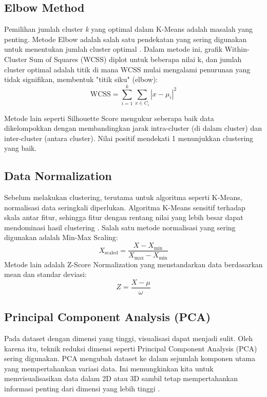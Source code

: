 \subsection{Elbow Method}
Pemilihan jumlah cluster \textit{k} yang optimal dalam K-Means adalah masalah yang penting. Metode Elbow adalah salah satu pendekatan yang sering digunakan untuk menentukan jumlah cluster optimal \cite{ElbowMethod}. Dalam metode ini, grafik Within-Cluster Sum of Squares (WCSS) diplot untuk beberapa nilai 
k, dan jumlah cluster optimal adalah titik di mana WCSS mulai mengalami penurunan yang tidak signifikan, membentuk "titik siku" (elbow):
\[
\text{WCSS} = \sum_{i=1}^k \sum_{x\in C_i} |x - \mu_i|^2
\]

Metode lain seperti Silhouette Score mengukur seberapa baik data dikelompokkan dengan membandingkan jarak intra-cluster (di dalam cluster) dan inter-cluster (antara cluster). Nilai positif mendekati 1 menunjukkan clustering yang baik.

\subsection{Data Normalization}
Sebelum melakukan clustering, terutama untuk algoritma seperti K-Means, normalisasi data seringkali diperlukan. Algoritma K-Means sensitif terhadap skala antar fitur, sehingga fitur dengan rentang nilai yang lebih besar dapat mendominasi hasil clustering \cite{ComparationMinMaxZScore}. Salah satu metode normalisasi yang sering digunakan adalah Min-Max Scaling:
\[
X_{\text{scaled}} = \frac{X - X_{\text{min}}}{X_{\text{max}} - X_{\text{min}}}
\]
Metode lain adalah Z-Score Normalization yang menstandarkan data berdasarkan mean dan standar deviasi:
\[
Z = \frac{X - \mu}{\omega}
\]

\subsection{Principal Component Analysis (PCA)}
Pada dataset dengan dimensi yang tinggi, visualisasi dapat menjadi sulit. Oleh karena itu, teknik reduksi dimensi seperti Principal Component Analysis (PCA) sering digunakan. PCA mengubah dataset ke dalam sejumlah komponen utama yang mempertahankan variasi data. Ini memungkinkan kita untuk memvisualisasikan data dalam 2D atau 3D sambil tetap mempertahankan informasi penting dari dimensi yang lebih tinggi \cite{PCAComponent}.

\newpage

